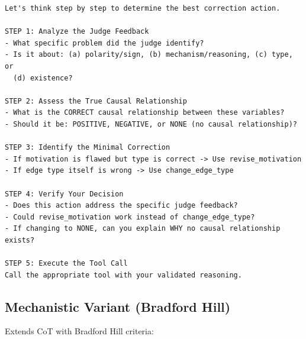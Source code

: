 \begin{small}
\begin{verbatim}
Let's think step by step to determine the best correction action.

STEP 1: Analyze the Judge Feedback
- What specific problem did the judge identify?
- Is it about: (a) polarity/sign, (b) mechanism/reasoning, (c) type, or
  (d) existence?

STEP 2: Assess the True Causal Relationship
- What is the CORRECT causal relationship between these variables?
- Should it be: POSITIVE, NEGATIVE, or NONE (no causal relationship)?

STEP 3: Identify the Minimal Correction
- If motivation is flawed but type is correct -> Use revise_motivation
- If edge type itself is wrong -> Use change_edge_type

STEP 4: Verify Your Decision
- Does this action address the specific judge feedback?
- Could revise_motivation work instead of change_edge_type?
- If changing to NONE, can you explain WHY no causal relationship exists?

STEP 5: Execute the Tool Call
Call the appropriate tool with your validated reasoning.
\end{verbatim}
\end{small}

\subsection{Mechanistic Variant (Bradford Hill)}
\label{sec:prompt_corrector_mechanistic}

Extends CoT with Bradford Hill criteria:

